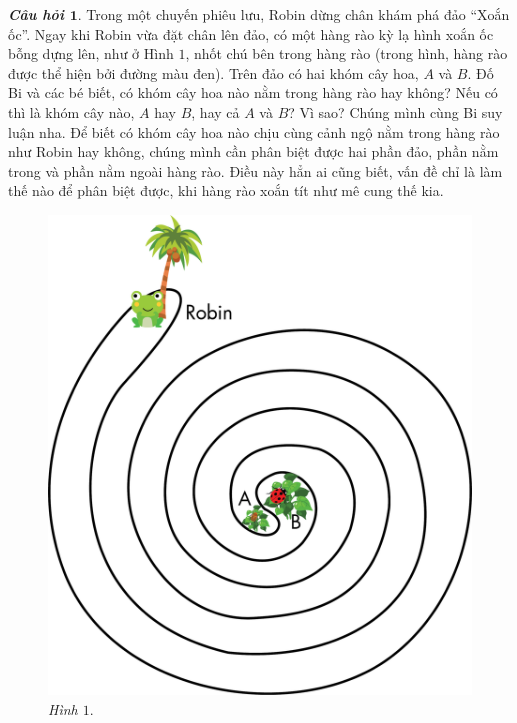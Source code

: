 \begin{multicols}{2}
	\textbf{\color{toancuabi}\textit{Câu hỏi $\pmb{1.}$}} Trong một chuyến phiêu lưu,  Robin dừng chân khám phá đảo “Xoắn ốc”. Ngay khi Robin vừa đặt chân lên đảo, có một hàng rào kỳ lạ hình xoắn ốc bỗng dựng lên, như ở Hình $1$, nhốt chú bên trong hàng rào (trong hình, hàng rào được thể hiện bởi đường màu đen). Trên đảo có hai khóm cây hoa, $A$ và $ B$. Đố Bi và các bé biết, có khóm cây hoa nào nằm trong hàng rào hay không? Nếu có thì là khóm cây nào, $ A$ hay $ B$, hay cả $ A$ và $ B$? Vì sao?
	\vskip 0.1cm
	Chúng mình cùng Bi suy luận nha.
	\vskip 0.1cm
	Để biết có khóm cây hoa nào chịu cùng cảnh ngộ nằm trong hàng rào như Robin hay không, chúng mình cần phân biệt được hai phần đảo, phần nằm trong và phần nằm ngoài hàng rào. Điều này hẳn ai cũng biết, vấn đề chỉ là làm thế nào để phân biệt được, khi hàng rào xoắn tít như mê cung thế kia.
	\begin{figure}[H]
		\centering
		\vspace*{-5pt}
		\captionsetup{labelformat= empty, justification=centering}
		\includegraphics[width=1\linewidth]{1}
		\caption{\small\textit{Hình $1.$}}
		\vspace*{-10pt}

\end{figure}
\end{multicols}
